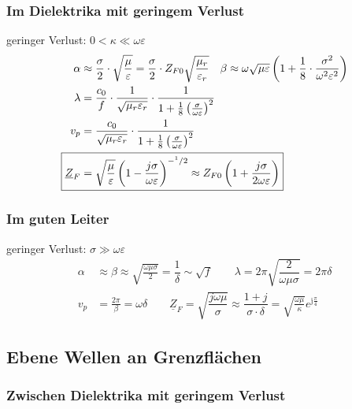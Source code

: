 \subsubsection{Im Dielektrika mit geringem Verlust}
geringer Verlust: $0 < \kappa \ll\omega\varepsilon$
\begin{align*}
    \alpha                  & \approx\dfrac{\sigma}{2}\cdot\sqrt{\dfrac{\mu}{\varepsilon}} = \frac{\sigma}{2}\cdot Z_{F0}\sqrt{\frac{\mu_r}{\varepsilon_r}}  \quad 
    \beta \approx\omega\sqrt{\mu\varepsilon}\left(1+\dfrac{1}{8}\cdot\dfrac{\sigma^2}{\omega^2\varepsilon^2}\right)                                                  \\
    \lambda                 & = \dfrac{c_0}{f}\cdot\dfrac{1}{\sqrt{\mu_r\varepsilon_r}}\cdot\frac{1}{1+\frac{1}{8}\left(\frac{\sigma}{\omega\varepsilon}\right)^2}                       \\
    v_p                     & = \dfrac{c_0}{\sqrt{\mu_r\varepsilon_r}}\cdot\frac{1}{1+\frac{1}{8}\left(\frac{\sigma}{\omega\varepsilon}\right)^2}                                        \\
    \Aboxed{\underline{Z}_F & = \sqrt{\dfrac{\mu}{\varepsilon}}\left(1-\frac{j\sigma}{\omega\varepsilon}\right)^{-^1/2} \approx Z_{F0}\left(1+\frac{j\sigma}{2\omega\varepsilon}\right)}
\end{align*}

\subsubsection{Im guten Leiter}
geringer Verlust: $\sigma \gg\omega\varepsilon$
\begin{align*}
    \alpha                  & \approx \beta \approx\sqrt{\frac{\omega\mu\sigma}{2}}=\dfrac{1}{\delta}\sim\sqrt{f} \qquad
    \lambda                 = 2\pi \sqrt{\dfrac{2}{\omega\mu\sigma}}=2\pi\delta                                 \\
    v_p                     & = \frac{2\pi}{\beta} = \omega\delta        \qquad                                        
    \boxed{\underline{Z}_F = \sqrt{\dfrac{j\omega\mu}{\sigma}} \approx \dfrac{1+j}{\sigma\cdot\delta} = \sqrt{\frac{\omega \mu}{\kappa}}e^{\mathrm{j}\frac{\pi}{4}}   }
\end{align*}
\subsection{Ebene Wellen an Grenzflächen}
\subsubsection{Zwischen Dielektrika mit geringem Verlust}

